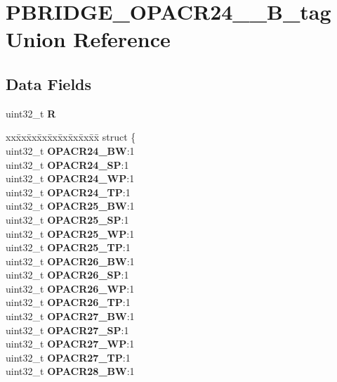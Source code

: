 \hypertarget{unionPBRIDGE__OPACR24__31__32B__tag}{}\section{P\+B\+R\+I\+D\+G\+E\+\_\+\+O\+P\+A\+C\+R24\+\_\+\_\+B\+\_\+tag Union Reference}
\label{unionPBRIDGE__OPACR24__31__32B__tag}
\subsection*{Data Fields}
\begin{DoxyCompactItemize}
\item 
\mbox{\label{unionPBRIDGE__OPACR24__31__32B__tag_a1b30e002dcfb0085651a2b3a2e4c23ed}} 
uint32\+\_\+t {\bfseries R}
\item 
\mbox{\label{unionPBRIDGE__OPACR24__31__32B__tag_a37bf97322f940275764dc07a07b2c2b8}} 
\begin{tabbing}
xx\=xx\=xx\=xx\=xx\=xx\=xx\=xx\=xx\=\kill
struct \{\\
\>uint32\_t {\bfseries OPACR24\_BW}:1\\
\>uint32\_t {\bfseries OPACR24\_SP}:1\\
\>uint32\_t {\bfseries OPACR24\_WP}:1\\
\>uint32\_t {\bfseries OPACR24\_TP}:1\\
\>uint32\_t {\bfseries OPACR25\_BW}:1\\
\>uint32\_t {\bfseries OPACR25\_SP}:1\\
\>uint32\_t {\bfseries OPACR25\_WP}:1\\
\>uint32\_t {\bfseries OPACR25\_TP}:1\\
\>uint32\_t {\bfseries OPACR26\_BW}:1\\
\>uint32\_t {\bfseries OPACR26\_SP}:1\\
\>uint32\_t {\bfseries OPACR26\_WP}:1\\
\>uint32\_t {\bfseries OPACR26\_TP}:1\\
\>uint32\_t {\bfseries OPACR27\_BW}:1\\
\>uint32\_t {\bfseries OPACR27\_SP}:1\\
\>uint32\_t {\bfseries OPACR27\_WP}:1\\
\>uint32\_t {\bfseries OPACR27\_TP}:1\\
\>uint32\_t {\bfseries OPACR28\_BW}:1\\

\end{tabbing}
\end{DoxyCompactItemize}
